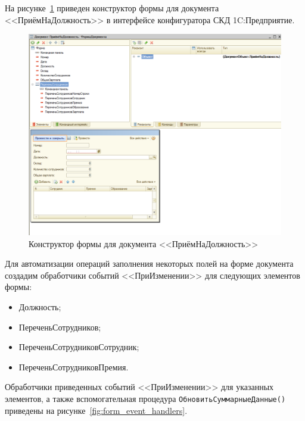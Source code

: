 На рисунке~\ref{fig:form} приведен конструктор формы для
документа <<ПриёмНаДолжность>> в интерфейсе конфигуратора
СКД 1C:Предприятие.

\begin{figure}[h!]
  \centering
  \includegraphics[width=150mm]{pic/form}
  \caption{Конструктор формы для документа <<ПриёмНаДолжность>>}
  \label{fig:form}
\end{figure}

Для автоматизации операций заполнения некоторых полей на форме документа
создадим обработчики событий <<ПриИзменении>> для следующих элементов формы:
\begin{itemize}
  \item Должность;
  \item ПереченьСотрудников;
  \item ПереченьСотрудниковСотрудник;
  \item ПереченьСотрудниковПремия.
\end{itemize}

\pagebreak

Обработчики приведенных событий <<ПриИзменении>> для указанных элементов,
а также вспомогательная процедура \texttt{ОбновитьСуммарныеДанные()}
приведены на рисунке~\ref{fig:form_event_handlers}.

